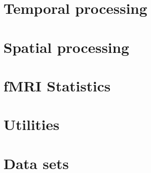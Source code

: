 \documentclass[a4paper,titlepage]{book}
\begin{document}
\part{Temporal processing}



\part{Spatial processing}







\part{fMRI Statistics}



\part{Utilities}












\part{Data sets}





\parskip=0mm
\end{document}
